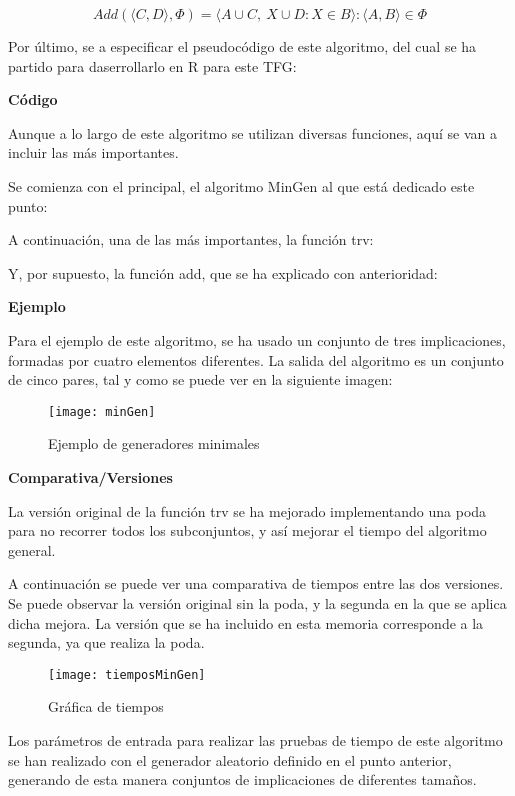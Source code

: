     \[
        Add(\langle C, {D} \rangle, \Phi) = {\langle A \cup C, ~ {X \cup D: X \in B} \rangle : \langle A, B\rangle \in \Phi}    
    \]


    Por \'ultimo, se a especificar el pseudoc\'odigo de este algoritmo, del cual se ha partido para daserrollarlo en R para este TFG:
    \bigskip

    

    \bigskip
    \textbf{C\'odigo}

    Aunque a lo largo de este algoritmo se utilizan diversas funciones, aqu\'i se van a incluir las m\'as importantes.
    
    Se comienza con el principal, el algoritmo MinGen al que est\'a dedicado este punto:

    

    A continuaci\'on, una de las m\'as importantes, la funci\'on trv:

    

    Y, por supuesto, la funci\'on add, que se ha explicado con anterioridad:

    

    \bigskip
    \textbf{Ejemplo}

    Para el ejemplo de este algoritmo, se ha usado un conjunto de tres implicaciones, formadas por cuatro elementos diferentes.
    La salida del algoritmo es un conjunto de cinco pares, tal y como se puede ver en la siguiente imagen:

    \begin{figure}[H]
        \centering
        \texttt{[image: minGen]}
        \caption{Ejemplo de generadores minimales}
        \label{fig:minGen}
    \end{figure}

    

    \bigskip
    \textbf{Comparativa/Versiones}

    La versi\'on original de la funci\'on trv se ha mejorado implementando una poda para no recorrer todos los subconjuntos, y as\'i 
    mejorar el tiempo del algoritmo general.

    A continuaci\'on se puede ver una comparativa de tiempos entre las dos versiones. Se puede observar la versi\'on original sin la poda, y 
    la segunda en la que se aplica dicha mejora. La versi\'on que se ha incluido en esta memoria corresponde a la segunda, ya que 
    realiza la poda.

    \begin{figure}[H]
        \centering
        \texttt{[image: tiemposMinGen]}
        \caption{Gr\'afica de tiempos}
        \label{fig:tiemposMinGen}
    \end{figure}


    Los par\'ametros de entrada para realizar las pruebas de tiempo de este algoritmo se han realizado con el generador aleatorio definido en 
    el punto anterior, generando de esta manera conjuntos de implicaciones de diferentes tama\~nos.

